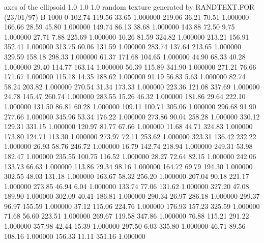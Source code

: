 axes of the ellipsoid
  1.0  1.0  1.0
random texture generated by RANDTEXT.FOR (23/01/97)
B 1000   0
    102.74    119.56     33.65  1.000000
    219.06     36.21     70.51  1.000000
    166.66     28.59     45.80  1.000000
    149.74     86.13     38.68  1.000000
    143.88     72.50      9.75  1.000000
     27.71      7.88    225.69  1.000000
     10.26     81.59    324.82  1.000000
    213.21    156.91    352.41  1.000000
    313.75     60.06    131.59  1.000000
    283.74    137.64    213.65  1.000000
    329.59    158.18    298.33  1.000000
     61.37    171.68    104.65  1.000000
     44.90     68.33     40.28  1.000000
     29.40    114.77    163.14  1.000000
     56.39    115.89    341.90  1.000000
    271.21     76.66    171.67  1.000000
    115.18     14.35    188.62  1.000000
     91.19     56.83      5.63  1.000000
     82.74     58.24    203.82  1.000000
    270.54     31.34    173.33  1.000000
    223.36    121.08    337.69  1.000000
     24.78    145.47    260.74  1.000000
    283.55     15.26     46.32  1.000000
    181.86     29.64    222.10  1.000000
    131.50     86.81     60.28  1.000000
    109.11    100.71    305.06  1.000000
    296.68     91.90    277.66  1.000000
    345.96     53.34    176.22  1.000000
    273.86     90.04    258.28  1.000000
    330.12    129.31    331.15  1.000000
    120.97     81.77     67.66  1.000000
     11.68     44.71    324.83  1.000000
    173.80    124.71    113.30  1.000000
    273.97     72.11    253.62  1.000000
    323.31    136.42    232.22  1.000000
     26.93     58.76    246.72  1.000000
     16.79    142.74    218.94  1.000000
    249.31     53.98    182.47  1.000000
    235.55    100.75    116.52  1.000000
     28.27     72.64     82.15  1.000000
    242.06    133.73     66.63  1.000000
    113.86     79.34     98.16  1.000000
    164.72     69.79    194.30  1.000000
    302.55     48.03    131.18  1.000000
    163.67     58.32    256.20  1.000000
    207.04     90.18    221.17  1.000000
    273.85     46.94      6.04  1.000000
    133.74     77.06    131.62  1.000000
    327.20     47.08    189.90  1.000000
    302.09     40.41    186.81  1.000000
    290.34     26.97    286.18  1.000000
    299.37     96.97    155.59  1.000000
     37.12    115.06    224.76  1.000000
    176.93    157.23    325.59  1.000000
     71.68     56.60    223.51  1.000000
    269.67    119.58    347.86  1.000000
     76.88    115.21    291.22  1.000000
    357.98     42.44     15.39  1.000000
    297.50      6.03    335.80  1.000000
     46.71     89.56    108.16  1.000000
    156.33     11.11    351.16  1.000000

